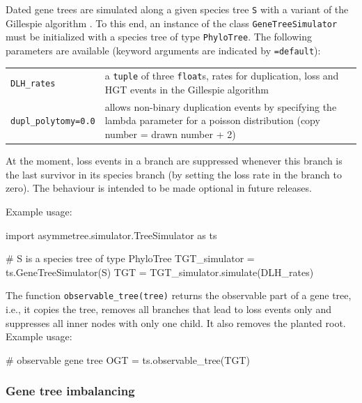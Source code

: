 \documentclass[hidelinks,11pt]{scrreprt}
\begin{document}
Dated gene trees are simulated along a given species tree \texttt{S} with a variant of the Gillespie algorithm \citep{gillespie1976}.
To this end, an instance of the class \texttt{GeneTreeSimulator} must be initialized with a species tree of type \texttt{PhyloTree}.
The following parameters are available (keyword arguments are indicated by \texttt{=default}):

\vspace{3mm}
\renewcommand{\arraystretch}{1.5}
\begin{tabularx}{0.95\textwidth} { >{\raggedright\arraybackslash}p{4cm} >{\raggedright\arraybackslash}X }
	\texttt{DLH\_rates} & a \texttt{tuple} of three \texttt{float}s, rates for duplication, loss and HGT events in the Gillespie algorithm\\
	\texttt{dupl\_polytomy=0.0}  & allows non-binary duplication events by specifying
	the lambda parameter for a poisson distribution (copy number = drawn number + 2)\\
\end{tabularx}
\vspace{3mm}

At the moment, loss events in a branch are suppressed whenever this branch is the last survivor in its species branch (by setting the loss rate in the branch to zero).
The behaviour is intended to be made optional in future releases.

Example usage:
\vspace{2mm}
\begin{python}
import asymmetree.simulator.TreeSimulator as ts

# S is a species tree of type PhyloTree
TGT_simulator = ts.GeneTreeSimulator(S)
TGT = TGT_simulator.simulate(DLH_rates)
\end{python}
\vspace{2mm}

The function \texttt{observable\_tree(tree)} returns the observable part of a gene tree, i.e., it copies the tree, removes all branches that lead to loss events only and suppresses all inner nodes with only one child. 
It also removes the planted root.
Example usage:
\vspace{2mm}
\begin{python}
# observable gene tree
OGT = ts.observable_tree(TGT)
\end{python}
\vspace{2mm}


\subsubsection{Gene tree imbalancing}
\end{document}
